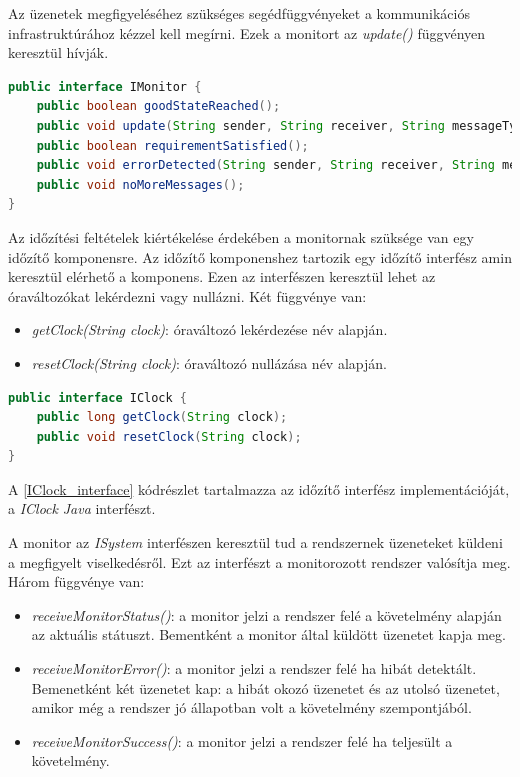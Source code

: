 Az üzenetek megfigyeléséhez szükséges segédfüggvényeket a kommunikációs infrastruktúrához kézzel kell megírni.
Ezek a monitort az \textit{update()} függvényen keresztül hívják.

\begin{lstlisting}[language=java,frame=single, float=h!, caption={Monitor interfész Java implementációja.},captionpos=b,label=IMonitor_interface]
public interface IMonitor {
	public boolean goodStateReached();
	public void update(String sender, String receiver, String messageType, Map<String, Object> parameters);
	public boolean requirementSatisfied();
	public void errorDetected(String sender, String receiver, String messageType, Map<String, Object> parameters);
	public void noMoreMessages();
}
\end{lstlisting}

Az időzítési feltételek kiértékelése érdekében a monitornak szüksége van egy időzítő komponensre.
Az időzítő komponenshez tartozik egy időzítő interfész amin keresztül elérhető a komponens.
Ezen az interfészen keresztül lehet az óraváltozókat lekérdezni vagy nullázni.
Két függvénye van:

\begin{itemize}
    \item \textit{getClock(String clock)}: óraváltozó lekérdezése név alapján.
    \item \textit{resetClock(String clock)}: óraváltozó nullázása név alapján.
\end{itemize}

\begin{lstlisting}[language=java,frame=single, float=h!, caption={Időzitő interfész Java implementációja.},captionpos=b,label=IClock_interface]
public interface IClock {
	public long getClock(String clock);
	public void resetClock(String clock);
}
\end{lstlisting}

A \ref{IClock_interface} kódrészlet tartalmazza az időzítő interfész implementációját, a \textit{IClock} \textit{Java} interfészt.

A monitor az \textit{ISystem} interfészen keresztül tud a rendszernek üzeneteket küldeni a megfigyelt viselkedésről.
Ezt az interfészt a monitorozott rendszer valósítja meg.
Három függvénye van:
\begin{itemize}
	\item \textit{receiveMonitorStatus()}: a monitor jelzi a rendszer felé a követelmény alapján az aktuális státuszt.
	Bementként a monitor által küldött üzenetet kapja meg.
	\item \textit{receiveMonitorError()}: a monitor jelzi a rendszer felé ha hibát detektált.
	Bemenetként két üzenetet kap: a hibát okozó üzenetet és az utolsó üzenetet, amikor még a rendszer jó állapotban volt a követelmény szempontjából.
	\item \textit{receiveMonitorSuccess()}: a monitor jelzi a rendszer felé ha teljesült a követelmény.
\end{itemize}


